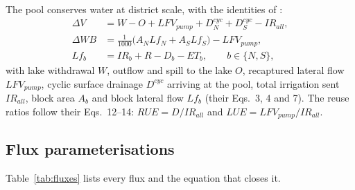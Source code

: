 \documentclass[11pt]{article}
\begin{document}
The pool conserves water at district scale, with the identities of \citet{Okura2025WaterBalance}:
\begin{align}
\Delta V &= W - O + LFV_{pump} + D^{cyc}_{N} + D^{cyc}_{S} - IR_{all}, \label{eq:pool}\\
\Delta WB &= \tfrac{1}{1000}\big(A_N Lf_N + A_S Lf_S\big) - LFV_{pump}, \label{eq:dwb}\\
Lf_b &= IR_b + R - D_b - ET_b, \qquad b \in \{N, S\}, \label{eq:lf}
\end{align}
with lake withdrawal $W$, outflow and spill to the lake $O$, recaptured lateral flow $LFV_{pump}$, cyclic surface drainage $D^{cyc}$ arriving at the pool, total irrigation sent $IR_{all}$, block area $A_b$ and block lateral flow $Lf_b$ (their Eqs.~3, 4 and 7). The reuse ratios follow their Eqs.~12--14: $RUE = D/IR_{all}$ and $LUE = LFV_{pump}/IR_{all}$.

\subsection{Flux parameterisations}
Table~\ref{tab:fluxes} lists every flux and the equation that closes it.
\end{document}
